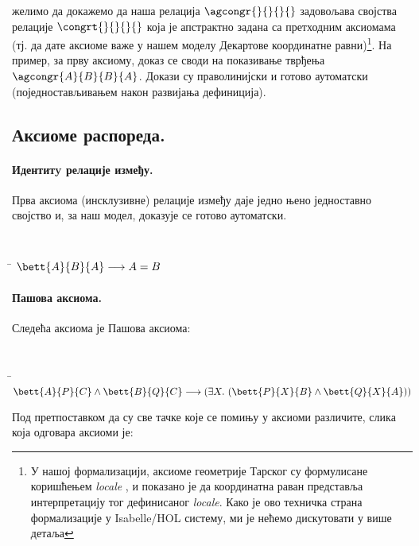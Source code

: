 желимо да докажемо да наша релација $\agcongr{}{}{}{}$ задовољава
својства релације $\congrt{}{}{}{}$ која је апстрактно задана са
претходним аксиомама (тј. да дате аксиоме важе у нашем моделу
Декартове координатне равни)\footnote{У нашој формализацији, аксиоме
  геометрије Тарског су формулисане коришћењем \emph{locale}
  \cite{locales}, и показано је да координатна раван представља
  интерпретацију тог дефинисаног \emph{locale}. Како је ово техничка
  страна формализације у Isabelle/HOL систему, ми је нећемо
  дискутовати у више детаља}.  На пример, за прву аксиому, доказ се
своди на показивање тврђења \mbox{$\agcongr{A}{B}{B}{A}$}. Докази су
праволинијски и готово аутоматски (поједностављивањем након развијања
дефиниција).

\subsection{Аксиоме распореда.}


\paragraph{Идентитy релације између.}

Прва аксиома (инсклузивне) релације између даје једно њено једноставно
својство и, за наш модел, доказује се готово аутоматски.

{\tt
\begin{tabbing}
\hspace{5mm}\=\kill
$\bett{A}{B}{A} \longrightarrow A = B$
\end{tabbing}
}

\paragraph{Пашова аксиома.}

Следећа аксиома је Пашова аксиома:
{\tt
\begin{tabbing}
\hspace{5mm}\=\kill
$\bett{A}{P}{C} \wedge \bett{B}{Q}{C} \longrightarrow (\exists X.\ (\bett{P}{X}{B} \wedge \bett{Q}{X}{A}))$
\end{tabbing}
}

Под претпоставком да су све тачке које се помињу у аксиоми различите,
слика која одговара аксиоми је:
\begin{center}

\end{center}


